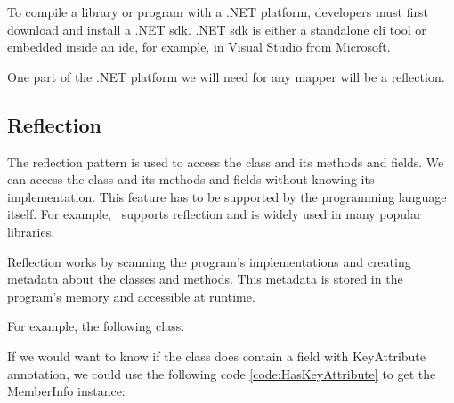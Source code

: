 To compile a library or program with a .NET platform, developers must first download and install a .NET \acrfull{sdk}.
.NET \acrfull{sdk} is either a standalone \acrfull{cli} tool or embedded inside an \acrshort{ide}, for example, in Visual Studio from Microsoft.

One part of the .NET platform we will need for any mapper will be a reflection.

\subsection{Reflection}

The reflection pattern is used to access the class and its methods and fields. We can access the class and its methods and fields without knowing its implementation.
This feature has to be supported by the programming language itself. For example, \CS\ supports reflection and is widely used in many popular libraries.

Reflection works by scanning the program's implementations and creating metadata about the classes and methods.
This metadata is stored in the program's memory and accessible at runtime.

For example, the following class:


If we would want to know if the class does contain a field with KeyAttribute annotation, we could use the following code \ref{code:HasKeyAttribute} to get the MemberInfo instance:



